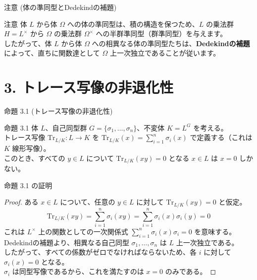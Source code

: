 \documentclass[aspectratio=169,11pt,unicode]{beamer}
\begin{document}
\begin{frame}{注意 (体の準同型とDedekindの補題)}
\begin{block}{注意}
体 $L$ から体 $\Omega$ への体の準同型は、積の構造を保つため、$L$ の乗法群 $H = L^\times$ から $\Omega$ の乗法群 $\Omega^\times$ への半群準同型（群準同型）を与えます。\\
\vspace{0.3cm}
したがって、体 $L$ から体 $\Omega$ への相異なる体の準同型たちは、\textbf{Dedekindの補題}によって、直ちに関数達として $\Omega$ 上一次独立であることが従います。
\end{block}
\end{frame}

\section{3. トレース写像の非退化性}

\begin{frame}{命題 3.1 (トレース写像の非退化性)}
\begin{block}{命題 3.1}
体 $L$、自己同型群 $G = \{\sigma_1, \dots, \sigma_n\}$、不変体 $K = L^G$ を考える。\\
トレース写像 $\mathrm{Tr}_{L/K} : L \to K$ を $\mathrm{Tr}_{L/K}(x) = \sum_{i=1}^n \sigma_i(x)$ で定義する（これは $K$ 線形写像）。\\
\vspace{0.2cm}
このとき、すべての $y \in L$ について $\mathrm{Tr}_{L/K}(xy) = 0$ となる $x \in L$ は $x=0$ しかない。
\end{block}
\end{frame}

\begin{frame}{命題 3.1 の証明}
\begin{proof}
ある $x \in L$ について、任意の $y \in L$ に対して $\mathrm{Tr}_{L/K}(xy) = 0$ と仮定。
\[ \mathrm{Tr}_{L/K}(xy) = \sum_{i=1}^n \sigma_i(xy) = \sum_{i=1}^n \sigma_i(x)\sigma_i(y) = 0 \]
これは $L^\times$ 上の関数としての一次関係式 $\sum_{i=1}^n \sigma_i(x) \sigma_i = 0$ を意味する。\\
Dedekindの補題より、相異なる自己同型 $\sigma_1, \dots, \sigma_n$ は $L$ 上一次独立である。\\
したがって、すべての係数がゼロでなければならないため、各 $i$ に対して $\sigma_i(x) = 0$ となる。\\
$\sigma_i$ は同型写像であるから、これを満たすのは $x = 0$ のみである。
\end{proof}
\end{frame}
\end{document}
